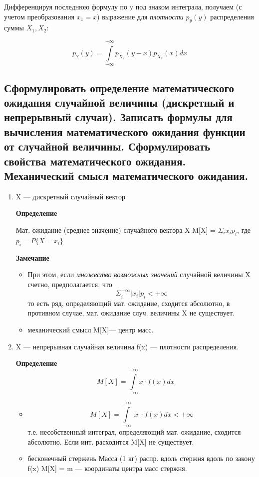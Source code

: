Дифференцируя последнюю формулу по y под знаком интеграла, получаем (с учетом преобразования $x_1 = x$) выражение для \textit{плотности} $p_y(y)$  распределения суммы $X_1, X_2:$ 

\begin{equation}
	p_Y(y) = \int\limits_{-\infty}^{+\infty}p_{X_2}(y - x)p_{X_1}(x)dx
\end{equation}

\subsection{Сформулировать определение математического ожидания случайной величины (дискретный и непрерывный случаи). Записать формулы для вычисления математического ожидания функции от случайной величины. Сформулировать свойства математического ожидания. Механический смысл математического ожидания.}

\begin{enumerate}[label=\Roman*]
	\item X --- дискретный случайный вектор
	
	\textbf{Определение}
	
	Мат. ожидание (среднее значение) случайного вектора X M[X] = $\Sigma_ix_i p_i$, где $p_i=P\{X=x_i\}$
	
	\textbf{Замечание}
	
	\begin{itemize}
		\item При этом, если \textit{множество возможных значений} случайной величины X счетно, предполагается, что 
		\begin{equation}
			\Sigma_i^{+\infty} |x_i| p_i < +\infty
		\end{equation}
	то есть ряд, определяющий мат. ожидание, сходится абсолютно, в противном случае, мат. ожидание случ. величины X не существует.
		\item механический смысл M[X]--- центр масс. 
	\end{itemize}

	\item X --- непрерывная случайная величина f(x) --- плотности распределения.
	
	\textbf{Определение}
\begin{equation}
	M[X] = \int\limits_{-\infty}^{+\infty} x \cdot f(x)dx
\end{equation}
	
	\begin{itemize}
		\item 
		\begin{equation}
			M[X] = \int\limits_{-\infty}^{+\infty} |x| \cdot f(x)dx < +\infty
		\end{equation} т.е. несобственный интеграл, определяющий мат. ожидание, сходится абсолютно. Если инт. расходится M[X] не существует.
		\item бесконечный стержень Масса (1 кг) распр. вдоль стержня вдоль по закону f(x) M[X] = m --- координаты центра масс стержня. 
	\end{itemize}
\end{enumerate}

